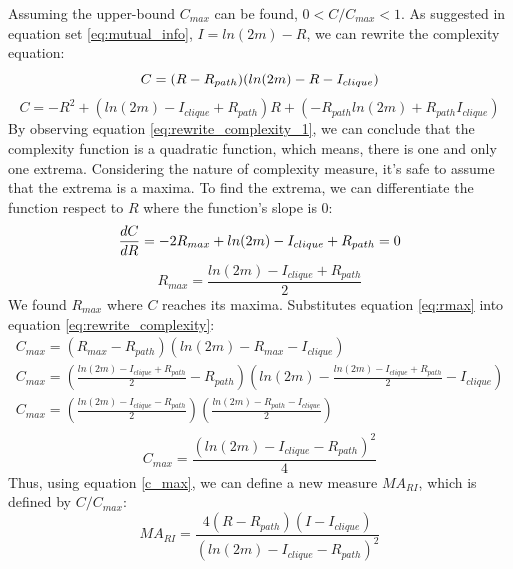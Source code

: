 \documentclass[12pt]{article}
\begin{document}
Assuming the upper-bound $C_{max}$ can be found, $0<C/C_{max}<1$. As suggested in equation set \ref{eq:mutual_info}, $I = ln(2m)-R$, we can rewrite the complexity equation:\\
\begin{equation}
    \label{eq:rewrite_complexity}
     C = (R-R_{path})(ln(2m)-R-I_{clique})\\
\end{equation}
\begin{equation}
    \label{eq:rewrite_complexity_1}
    C = -R^2+(ln(2m)-I_{clique}+R_{path})R+(-R_{path}ln(2m)+R_{path}I_{clique})
\end{equation}
By observing equation \ref{eq:rewrite_complexity_1}, we can conclude that the complexity function is a quadratic function, which means, there is one and only one extrema. Considering the nature of complexity measure, it's safe to assume that the extrema is a maxima. To find the extrema, we can differentiate the function respect to $R$ where the function's slope is 0:
\begin{equation}
    \label{eq:mari_diff}
        \frac{dC}{dR} = -2R_{max}+ln(2m)-I_{clique}+R_{path} = 0\\
\end{equation}
\begin{equation}
    \label{eq:rmax}
    R_{max} = \frac{ln(2m)-I_{clique}+R_{path}}{2}
\end{equation}
\noindent
We found $R_{max}$ where $C$ reaches its maxima. 
Substitutes equation \ref{eq:rmax} into equation \ref{eq:rewrite_complexity}:\\
\begin{equation}
    \begin{gathered}
        C_{max} =(R_{max}-R_{path})(ln(2m)-R_{max}-I_{clique})\\
        C_{max} = (\frac{ln(2m)-I_{clique}+R_{path}}{2}-R_{path})(ln(2m)-\frac{ln(2m)-I_{clique}+R_{path}}{2}-I_{clique})\\
        C_{max} = (\frac{ln(2m)-I_{clique}-R_{path}}{2})(\frac{ln(2m)-R_{path}-I_{clique}}{2})\\
    \end{gathered}
\end{equation}
\begin{equation}
    \label{c_max}
    C_{max} = \frac{(ln(2m)-I_{clique}-R_{path})^2}{4}
\end{equation}
\noindent
Thus, using equation \ref{c_max}, we can define a new measure $MA_{RI}$, which is defined by $C/C_{max}$:\\
\begin{equation}
    MA_{RI} = \frac{4(R-R_{path})(I-I_{clique})}{(ln(2m)-I_{clique}-R_{path})^2}
\end{equation}
\end{document}
